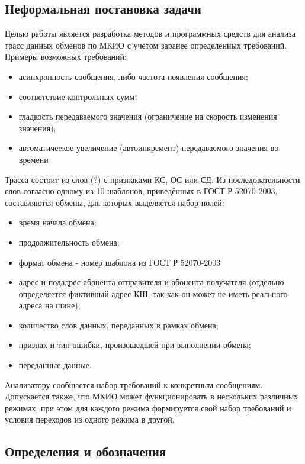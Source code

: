 \iffalse
\subsection{Неформальная постановка задачи}

Целью работы является разработка методов и программных средств для 
анализа трасс данных обменов по МКИО с учётом заранее определённых требований. 
Примеры возможных требований:

\begin{itemize}
 \item асинхронность сообщения, либо частота появления сообщения;
 \item соответствие контрольных сумм;
 \item гладкость передаваемого значения (ограничение на скорость изменения 
значения);
 \item автоматичеcкое увеличение (автоинкремент) передаваемого значения во 
времени
\end{itemize}

Трасса состоит из слов (?) с признаками КС, ОС или СД. Из последовательности 
слов согласно одному из 10 шаблонов, приведённых в ГОСТ Р 52070-2003, 
составляются обмены, для которых выделяется набор полей:

\begin{itemize}
 \item время начала обмена;
 \item продолжительность обмена;
 \item формат обмена - номер шаблона из ГОСТ Р 52070-2003
 \item адрес и подадрес абонента-отправителя и абонента-получателя (отдельно 
определяется фиктивный адрес КШ, так как он может не иметь реального адреса на 
шине);
 \item количество слов данных, переданных в рамках обмена;
 \item признак и тип ошибки, произошедшей при выполнении обмена;
 \item переданные данные.
\end{itemize}

Анализатору сообщается набор требований к конкретным сообщениям. 
Допускается также, что МКИО может функционировать в нескольких различных 
режимах, при этом для каждого режима формируется свой набор требований и 
условия переходов из одного режима в другой.

\subsection{Определения и обозначения}

